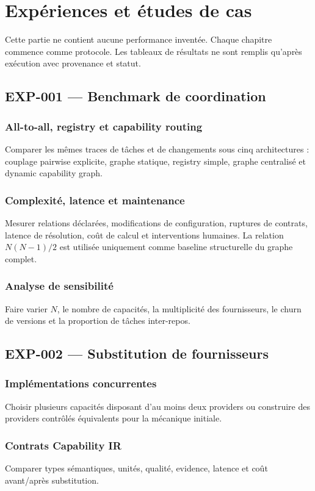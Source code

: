\part{Expériences et études de cas}

Cette partie ne contient aucune performance inventée. Chaque chapitre commence comme protocole. Les tableaux de résultats ne sont remplis qu'après exécution avec provenance et statut.

\chapter{EXP-001 — Benchmark de coordination}
\section{All-to-all, registry et capability routing}
Comparer les mêmes traces de tâches et de changements sous cinq architectures : couplage pairwise explicite, graphe statique, registry simple, graphe centralisé et dynamic capability graph.

\section{Complexité, latence et maintenance}
Mesurer relations déclarées, modifications de configuration, ruptures de contrats, latence de résolution, coût de calcul et interventions humaines. La relation $N(N-1)/2$ est utilisée uniquement comme baseline structurelle du graphe complet.

\section{Analyse de sensibilité}
Faire varier $N$, le nombre de capacités, la multiplicité des fournisseurs, le churn de versions et la proportion de tâches inter-repos.

\chapter{EXP-002 — Substitution de fournisseurs}
\section{Implémentations concurrentes}
Choisir plusieurs capacités disposant d'au moins deux providers ou construire des providers contrôlés équivalents pour la mécanique initiale.

\section{Contrats Capability IR}
Comparer types sémantiques, unités, qualité, evidence, latence et coût avant/après substitution.

